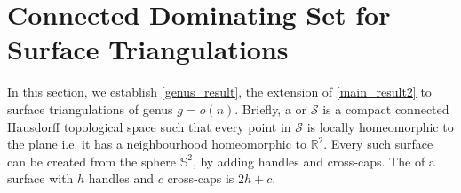 \section{Connected Dominating Set for Surface Triangulations}
\label{bounded_genus}
In this section, we establish \cref{genus_result}, the extension of \cref{main_result2} to surface triangulations of genus $g = o(n)$.
Briefly, a  or  $\mathcal{S}$ is a compact connected Hausdorff topological space such that every point in $\mathcal{S}$ is locally homeomorphic to the plane i.e. it has a neighbourhood homeomorphic to $\mathbb{R}^2$. Every such surface can be created from the sphere $\mathbb{S}^2$, by adding handles and cross-caps. The  of a surface with $h$ handles and $c$ cross-caps is $2h+c$.

